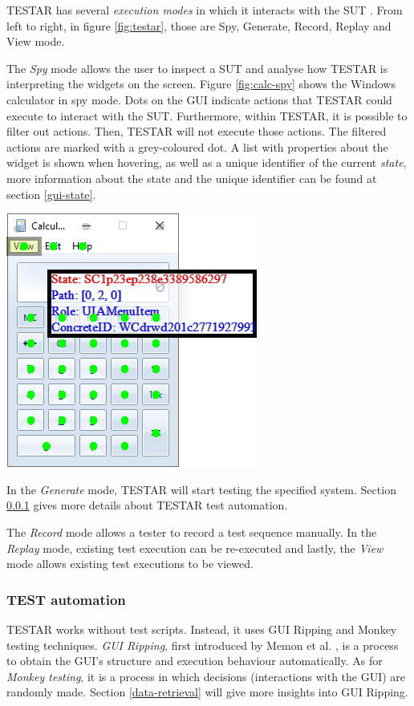 TESTAR has several \emph{execution modes} in which it interacts with the SUT \cite{testar-manual}. From left to right, in figure \ref{fig:testar}, those are Spy, Generate, Record, Replay and View mode.

The \emph{Spy} mode allows the user to inspect a SUT and analyse how TESTAR is interpreting the widgets on the screen. Figure \ref{fig:calc-spy} shows the Windows calculator in spy mode. Dots on the GUI indicate actions that TESTAR could execute to interact with the SUT. Furthermore, within TESTAR, it is possible to filter out actions. Then, TESTAR will not execute those actions. The filtered actions are marked with a grey-coloured dot. A list with properties about the widget is shown when hovering, as well as a unique identifier of the current \emph{state}, more information about the state and the unique identifier can be found at section \ref{gui-state}.\par

\bigskip
\begingroup
\captionsetup{type=figure}
\includegraphics{images/calc-state.png}
\label{fig:calc-spy}
\endgroup

In the \emph{Generate} mode, TESTAR will start testing the specified system. Section \ref{testar-testauto} gives more details about TESTAR test automation.

The \emph{Record} mode allows a tester to record a test sequence manually. In the \emph{Replay} mode, existing test execution can be re-executed and lastly, the \emph{View} mode allows existing test executions to be viewed.

\newpage
\subsubsection{TEST automation} \label{testar-testauto}
TESTAR works without test scripts. Instead, it uses GUI Ripping and Monkey testing techniques. \emph{GUI Ripping}, first introduced by Memon et al. \cite{gui-ripping}, is a process to obtain the GUI's structure and execution behaviour automatically. As for \emph{Monkey testing}, it is a process in which decisions (interactions with the GUI) are randomly made. Section \ref{data-retrieval} will give more insights into GUI Ripping.

